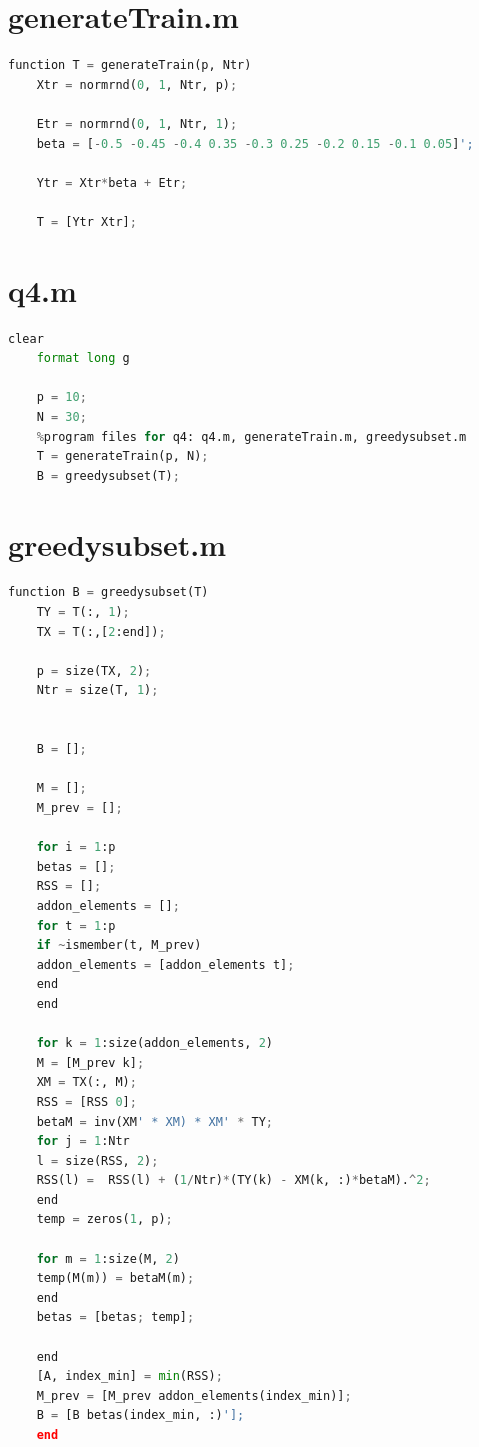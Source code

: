 \documentclass{article}
\begin{document}
\section{generateTrain.m}
\label{ap:generateTrain}
\begin{lstlisting}[language = python]
	function T = generateTrain(p, Ntr)
	Xtr = normrnd(0, 1, Ntr, p);
	
	Etr = normrnd(0, 1, Ntr, 1);
	beta = [-0.5 -0.45 -0.4 0.35 -0.3 0.25 -0.2 0.15 -0.1 0.05]';
	
	Ytr = Xtr*beta + Etr;
	
	T = [Ytr Xtr];
\end{lstlisting}

\section{q4.m}
\label{ap:q4}
\begin{lstlisting}[language=python]
	clear
	format long g
	
	p = 10;
	N = 30;
	%program files for q4: q4.m, generateTrain.m, greedysubset.m
	T = generateTrain(p, N);
	B = greedysubset(T);
\end{lstlisting}

\section{greedysubset.m}
\label{ap:greedysubset}
\begin{lstlisting}[language=python]
	function B = greedysubset(T)
	TY = T(:, 1);
	TX = T(:,[2:end]);
	
	p = size(TX, 2);
	Ntr = size(T, 1);
	
	
	B = [];
	
	M = [];
	M_prev = [];
	
	for i = 1:p
	betas = [];
	RSS = [];
	addon_elements = [];
	for t = 1:p
	if ~ismember(t, M_prev)
	addon_elements = [addon_elements t];
	end
	end
	
	for k = 1:size(addon_elements, 2)
	M = [M_prev k];
	XM = TX(:, M);
	RSS = [RSS 0];
	betaM = inv(XM' * XM) * XM' * TY;
	for j = 1:Ntr
	l = size(RSS, 2);
	RSS(l) =  RSS(l) + (1/Ntr)*(TY(k) - XM(k, :)*betaM).^2;
	end
	temp = zeros(1, p);
	
	for m = 1:size(M, 2)
	temp(M(m)) = betaM(m);
	end
	betas = [betas; temp];
	
	end
	[A, index_min] = min(RSS);
	M_prev = [M_prev addon_elements(index_min)];
	B = [B betas(index_min, :)'];
	end
\end{lstlisting}
\end{document}
